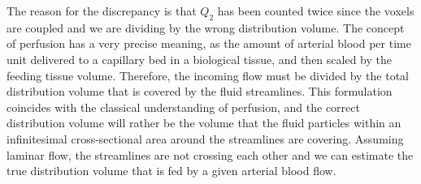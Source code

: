 \documentclass[paper=a4, fontsize=11pt,parskip=half,headings=small]{scrartcl}
\newcommand{\Perf}{Q}
\begin{document}
	The reason for the discrepancy is that $\Perf_{2}$ has been counted twice since the voxels are coupled and we are dividing by the wrong distribution volume. 
	The concept of perfusion has a very precise meaning, as the amount of arterial blood per time unit delivered to a capillary bed in a biological tissue, and then scaled by the feeding tissue volume. 
	Therefore, the incoming flow must be divided by the total distribution volume that is covered by the fluid streamlines. 
	This formulation coincides with the classical understanding of perfusion, and the correct distribution volume will rather be the volume that the fluid particles within an infinitesimal cross-sectional area around the streamlines are covering. 
	Assuming laminar flow, the streamlines are not crossing each other and we can estimate the true distribution volume that is fed by a given arterial blood flow.
\end{document}
